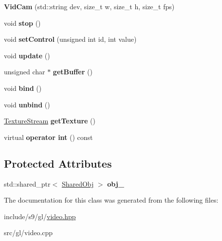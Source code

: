 \begin{DoxyCompactItemize}
\item 
\hypertarget{classs9_1_1gl_1_1VidCam_ab7b7d40a63010fe4f660960a938c933e}{{\bfseries Vid\-Cam} (std\-::string dev, size\-\_\-t w, size\-\_\-t h, size\-\_\-t fps)}\label{classs9_1_1gl_1_1VidCam_ab7b7d40a63010fe4f660960a938c933e}

\item 
\hypertarget{classs9_1_1gl_1_1VidCam_a776223db7cf76959916b0adac5304334}{void {\bfseries stop} ()}\label{classs9_1_1gl_1_1VidCam_a776223db7cf76959916b0adac5304334}

\item 
\hypertarget{classs9_1_1gl_1_1VidCam_af84be51c46c1262095841f2c8cad309e}{void {\bfseries set\-Control} (unsigned int id, int value)}\label{classs9_1_1gl_1_1VidCam_af84be51c46c1262095841f2c8cad309e}

\item 
\hypertarget{classs9_1_1gl_1_1VidCam_ad9923fb1bed89ffeb660c1a8fc44e44a}{void {\bfseries update} ()}\label{classs9_1_1gl_1_1VidCam_ad9923fb1bed89ffeb660c1a8fc44e44a}

\item 
\hypertarget{classs9_1_1gl_1_1VidCam_a3d838a3a1eba7d7dbc2e2295f8e6b8be}{unsigned char $\ast$ {\bfseries get\-Buffer} ()}\label{classs9_1_1gl_1_1VidCam_a3d838a3a1eba7d7dbc2e2295f8e6b8be}

\item 
\hypertarget{classs9_1_1gl_1_1VidCam_a6650fae05fc02a3b8c8d5940fb6cdfc6}{void {\bfseries bind} ()}\label{classs9_1_1gl_1_1VidCam_a6650fae05fc02a3b8c8d5940fb6cdfc6}

\item 
\hypertarget{classs9_1_1gl_1_1VidCam_af250738be8d821de4fea4b651f17ed29}{void {\bfseries unbind} ()}\label{classs9_1_1gl_1_1VidCam_af250738be8d821de4fea4b651f17ed29}

\item 
\hypertarget{classs9_1_1gl_1_1VidCam_ac761bc22ec13a4c2f5da46ecadff207d}{\hyperlink{classs9_1_1gl_1_1TextureStream}{Texture\-Stream} {\bfseries get\-Texture} ()}\label{classs9_1_1gl_1_1VidCam_ac761bc22ec13a4c2f5da46ecadff207d}

\item 
\hypertarget{classs9_1_1gl_1_1VidCam_a00065c23817f840f6b843646394a8e9b}{virtual {\bfseries operator int} () const }\label{classs9_1_1gl_1_1VidCam_a00065c23817f840f6b843646394a8e9b}

\end{DoxyCompactItemize}
\subsection*{Protected Attributes}
\begin{DoxyCompactItemize}
\item 
\hypertarget{classs9_1_1gl_1_1VidCam_a7ff9107052366f02d700a4c7dffe2397}{std\-::shared\-\_\-ptr$<$ \hyperlink{structs9_1_1gl_1_1VidCam_1_1SharedObj}{Shared\-Obj} $>$ {\bfseries obj\-\_\-}}\label{classs9_1_1gl_1_1VidCam_a7ff9107052366f02d700a4c7dffe2397}

\end{DoxyCompactItemize}


The documentation for this class was generated from the following files\-:\begin{DoxyCompactItemize}
\item 
include/s9/gl/\hyperlink{video_8hpp}{video.\-hpp}\item 
src/gl/video.\-cpp\end{DoxyCompactItemize}
